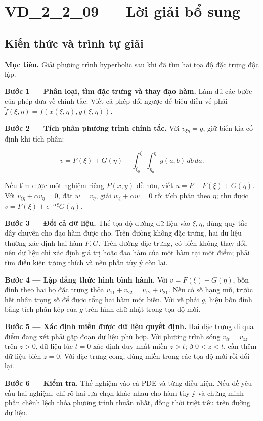\documentclass[10pt,a4paper]{article}
\begin{document}
\section*{VD\_2\_2\_09 — Lời giải bổ sung}
\subsection*{Kiến thức và trình tự giải}
\textbf{Mục tiêu.} Giải phương trình hyperbolic sau khi đã tìm hai tọa độ đặc trưng độc lập.

\textbf{Bước 1 — Phân loại, tìm đặc trưng và thay đạo hàm.} Làm đủ các bước của phép đưa về chính tắc. Viết cả phép đổi ngược để biểu diễn vế phải $\widetilde f(\xi,\eta)=f(x(\xi,\eta),y(\xi,\eta))$.

\textbf{Bước 2 — Tích phân phương trình chính tắc.} Với $v_{\xi\eta}=g$, giữ biến kia cố định khi tích phân:


\[
v=F(\xi)+G(\eta)+\int_{\xi_0}^{\xi}\int_{\eta_0}^{\eta}g(a,b)\,db\,da.
\]


Nếu tìm được một nghiệm riêng $P(x,y)$ dễ hơn, viết $u=P+F(\xi)+G(\eta)$. Với $v_{\xi\eta}+\alpha v_\eta=0$, đặt $w=v_\eta$, giải $w_\xi+\alpha w=0$ rồi tích phân theo $\eta$; thu được $v=F(\xi)+e^{-\alpha\xi}G(\eta)$.

\textbf{Bước 3 — Đổi cả dữ liệu.} Thế tọa độ đường dữ liệu vào $\xi,\eta$, dùng quy tắc dây chuyền cho đạo hàm được cho. Trên đường không đặc trưng, hai dữ liệu thường xác định hai hàm $F,G$. Trên đường đặc trưng, có biến không thay đổi, nên dữ liệu chỉ xác định giá trị hoặc đạo hàm của một hàm tại một điểm; phải tìm điều kiện tương thích và nêu phần tùy ý còn lại.

\textbf{Bước 4 — Lập đẳng thức hình bình hành.} Với $v=F(\xi)+G(\eta)$, bốn đỉnh theo hai họ đặc trưng thỏa $v_{11}+v_{22}=v_{12}+v_{21}$. Nếu có số hạng mũ, trước hết nhân trọng số để được tổng hai hàm một biến. Với vế phải $g$, hiệu bốn đỉnh bằng tích phân kép của $g$ trên hình chữ nhật trong tọa độ mới.

\textbf{Bước 5 — Xác định miền được dữ liệu quyết định.} Hai đặc trưng đi qua điểm đang xét phải gặp đoạn dữ liệu phù hợp. Với phương trình sóng $v_{tt}=v_{zz}$ trên $z>0$, dữ liệu lúc $t=0$ xác định duy nhất miền $z>t$; ở $0<z<t$, cần thêm dữ liệu biên $z=0$. Với đặc trưng cong, dùng miền trong các tọa độ mới rồi đổi lại.

\textbf{Bước 6 — Kiểm tra.} Thế nghiệm vào cả PDE và từng điều kiện. Nếu đề yêu cầu hai nghiệm, chỉ rõ hai lựa chọn khác nhau cho hàm tùy ý và chứng minh phần chênh lệch thỏa phương trình thuần nhất, đồng thời triệt tiêu trên đường dữ liệu.
\end{document}

